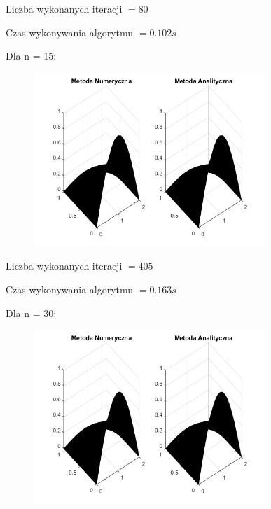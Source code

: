 Liczba wykonanych iteracji $ = 80 $

Czas wykonywania algorytmu $ = 0.102 s$

Dla n = 15:

\begin{figure}[!ht]
	\begin{center}
		\includegraphics[width=0.78\textwidth]{Lab7/charts/ftcs/15.png}
	\end{center}
\end{figure}

Liczba wykonanych iteracji $ = 405 $

Czas wykonywania algorytmu $ = 0.163 s$

\newpage

Dla n = 30:

\begin{figure}[!ht]
	\begin{center}
		\includegraphics[width=0.78\textwidth]{Lab7/charts/ftcs/30.png}
	\end{center}
\end{figure}

